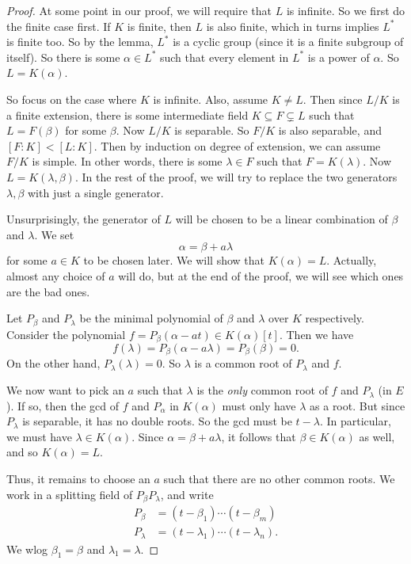 \documentclass[a4paper]{article}
\begin{document}
\begin{proof}
  At some point in our proof, we will require that $L$ is infinite. So we first do the finite case first. If $K$ is finite, then $L$ is also finite, which in turns implies $L^*$ is finite too. So by the lemma, $L^*$ is a cyclic group (since it is a finite subgroup of itself). So there is some $\alpha \in L^*$ such that every element in $L^*$ is a power of $\alpha$. So $L = K(\alpha)$.

  So focus on the case where $K$ is infinite. Also, assume $K \not= L$. Then since $L/K$ is a finite extension, there is some intermediate field $K\subseteq F\subsetneq L$ such that $L = F(\beta)$ for some $\beta$. Now $L/K$ is separable. So $F/K$ is also separable, and $[F:K] < [L:K]$. Then by induction on degree of extension, we can assume $F/K$ is simple. In other words, there is some $\lambda \in F$ such that $F = K(\lambda)$. Now $L = K(\lambda, \beta)$. In the rest of the proof, we will try to replace the two generators $\lambda, \beta$ with just a single generator.

  Unsurprisingly, the generator of $L$ will be chosen to be a linear combination of $\beta$ and $\lambda$. We set
  \[
    \alpha = \beta + a \lambda
  \]
  for some $a \in K$ to be chosen later. We will show that $K(\alpha) = L$. Actually, almost any choice of $a$ will do, but at the end of the proof, we will see which ones are the bad ones.

  Let $P_\beta$ and $P_\lambda$ be the minimal polynomial of $\beta$ and $\lambda$ over $K$ respectively. Consider the polynomial $f = P_\beta(\alpha - at) \in K(\alpha)[t]$. Then we have
  \[
    f(\lambda) = P_\beta(\alpha - a\lambda) = P_\beta(\beta) = 0.
  \]
  On the other hand, $P_\lambda(\lambda) = 0$. So $\lambda$ is a common root of $P_\lambda$ and $f$.

  We now want to pick an $a$ such that $\lambda$ is the \emph{only} common root of $f$ and $P_\lambda$ (in $E$). If so, then the gcd of $f$ and $P_\alpha$ in $K(\alpha)$ must only have $\lambda$ as a root. But since $P_\lambda$ is separable, it has no double roots. So the gcd must be $t - \lambda$. In particular, we must have $\lambda \in K(\alpha)$. Since $\alpha = \beta + a \lambda$, it follows that $\beta \in K(\alpha)$ as well, and so $K(\alpha )= L$.

  Thus, it remains to choose an $a$ such that there are no other common roots. We work in a splitting field of $P_\beta P_\lambda$, and write
  \begin{align*}
    P_\beta &= (t - \beta_1)\cdots (t - \beta_m)\\
    P_\lambda &= (t - \lambda_1) \cdots (t - \lambda_n).
  \end{align*}
  We wlog $\beta_1 = \beta$ and $\lambda_1 = \lambda$.


\end{proof}
\end{document}
